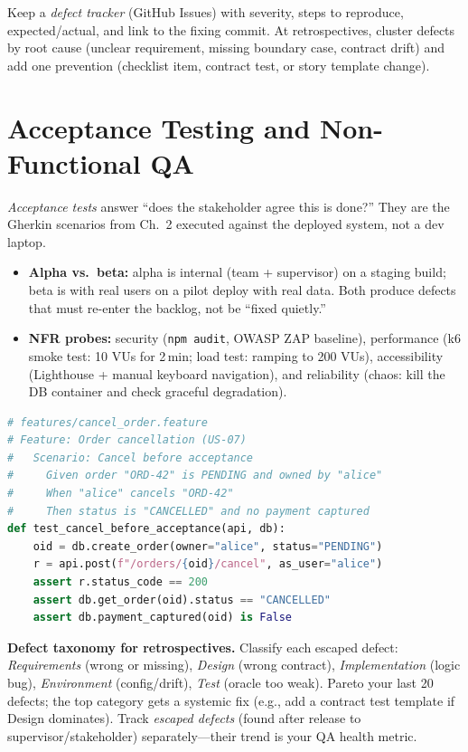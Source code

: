 Keep a \emph{defect tracker} (GitHub Issues) with severity, steps to reproduce, expected/actual, and link to the fixing commit. At retrospectives, cluster defects by root cause (unclear requirement, missing boundary case, contract drift) and add one prevention (checklist item, contract test, or story template change).

\section{Acceptance Testing and Non-Functional QA}
\label{sec:acceptance-nfr}

\emph{Acceptance tests} answer ``does the stakeholder agree this is done?'' They are the Gherkin scenarios from Ch.~2 executed against the deployed system, not a dev laptop.

\begin{itemize}
    \item \textbf{Alpha vs.\ beta:} alpha is internal (team + supervisor) on a staging build; beta is with real users on a pilot deploy with real data. Both produce defects that must re-enter the backlog, not be ``fixed quietly.''
    \item \textbf{NFR probes:} security (\texttt{npm audit}, OWASP ZAP baseline), performance (k6 smoke test: 10 VUs for 2\,min; load test: ramping to 200 VUs), accessibility (Lighthouse + manual keyboard navigation), and reliability (chaos: kill the DB container and check graceful degradation).
\end{itemize}

\begin{lstlisting}[language=Python,caption={Acceptance test as executable Gherkin (behave/pytest-bdd): Given/When/Then maps to fixtures and assertions.},label={lst:acceptance}]
# features/cancel_order.feature
# Feature: Order cancellation (US-07)
#   Scenario: Cancel before acceptance
#     Given order "ORD-42" is PENDING and owned by "alice"
#     When "alice" cancels "ORD-42"
#     Then status is "CANCELLED" and no payment captured
def test_cancel_before_acceptance(api, db):
    oid = db.create_order(owner="alice", status="PENDING")
    r = api.post(f"/orders/{oid}/cancel", as_user="alice")
    assert r.status_code == 200
    assert db.get_order(oid).status == "CANCELLED"
    assert db.payment_captured(oid) is False
\end{lstlisting}

\textbf{Defect taxonomy for retrospectives.} Classify each escaped defect: \emph{Requirements} (wrong or missing), \emph{Design} (wrong contract), \emph{Implementation} (logic bug), \emph{Environment} (config/drift), \emph{Test} (oracle too weak). Pareto your last 20 defects; the top category gets a systemic fix (e.g., add a contract test template if Design dominates). Track \emph{escaped defects} (found after release to supervisor/stakeholder) separately---their trend is your QA health metric.

